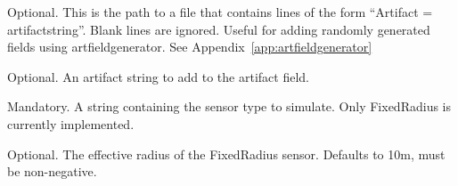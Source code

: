 \begin{hangpar}{\pin}{}
Optional. This is the path to a file that contains lines of the form ``Artifact = artifactstring''.  Blank lines are ignored.  Useful for adding randomly generated fields using artfieldgenerator.  See Appendix~\ref{app:artfieldgenerator}
\end{hangpar}

\begin{hangpar}{\pin}{}
Optional. An artifact string to add to the artifact field.
\end{hangpar}

\begin{hangpar}{\pin}{}
Mandatory. A string containing the sensor type to simulate.  Only FixedRadius is currently implemented.
\end{hangpar}

\begin{hangpar}{\pin}{}
Optional. The effective radius of the FixedRadius sensor.  Defaults to 10m, must be non-negative.
\end{hangpar}
